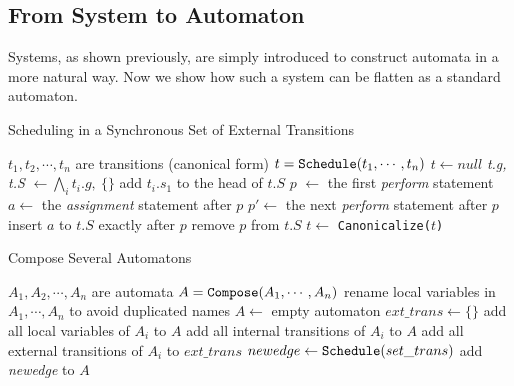 \subsection{From System to Automaton}
\label{subsec:composition}

Systems, as shown previously, are simply introduced to construct automata in a more natural way. Now we show how such a system can be flatten as a standard automaton.

\begin{algorithm}[H]
    \caption{Scheduling in a Synchronous Set of External Transitions}
    \label{alg:synchronize}
    \begin{algorithmic}[1]
        \REQUIRE $t_1,t_2,\cdots,t_n$ are transitions (canonical form)
        \ENSURE $t=\mbox{\texttt{Schedule}}(t_1,\cdots,t_n)$
            \STATE $t\leftarrow null$
            \RETURN
        \ENDIF
        \STATE \emph{t.g, t.S} $\leftarrow \bigwedge_i t_i.g,\:\{\}$
            \STATE add $t_i.s_1$ to the head of $t.S$
            \ENDIF
            \STATE $p$ $\leftarrow$ the first \emph{perform} statement
                \STATE $a\leftarrow$ the \emph{assignment} statement after $p$
                \STATE $p'\leftarrow$ the next \emph{perform} statement after $p$
                    \STATE insert $a$ to $t.S$ exactly after $p$
                    \STATE remove $p$ from $t.S$
                \ENDIF
            \ENDWHILE
        \ENDFOR
        \STATE $t\leftarrow$ \texttt{Canonicalize($t$)}
    \end{algorithmic}
\end{algorithm}

\begin{algorithm}[H]
    \caption{Compose Several Automatons}
    \label{alg:compose}
    \begin{algorithmic}[1]
        \REQUIRE $A_1,A_2,\cdots,A_n$ are automata
        \ENSURE $A=\mbox{\texttt{Compose}}(A_1,\cdots,A_n)$
        \STATE rename local variables in $A_1,\cdots,A_n$ to avoid duplicated names
        \STATE $A \leftarrow $ empty automaton
        \STATE $ext\_trans\leftarrow \{\}$
            \STATE add all local variables of $A_i$ to $A$
            \STATE add all internal transitions of $A_i$ to $A$
            \STATE add all external transitions of $A_i$ to $ext\_trans$
        \ENDFOR
            \STATE $newedge\leftarrow \mbox{\texttt{Schedule}}(set\_trans)$ 
                \STATE add \emph{newedge} to $A$
            \ENDIF
        \ENDFOR
    \end{algorithmic}
\end{algorithm}

